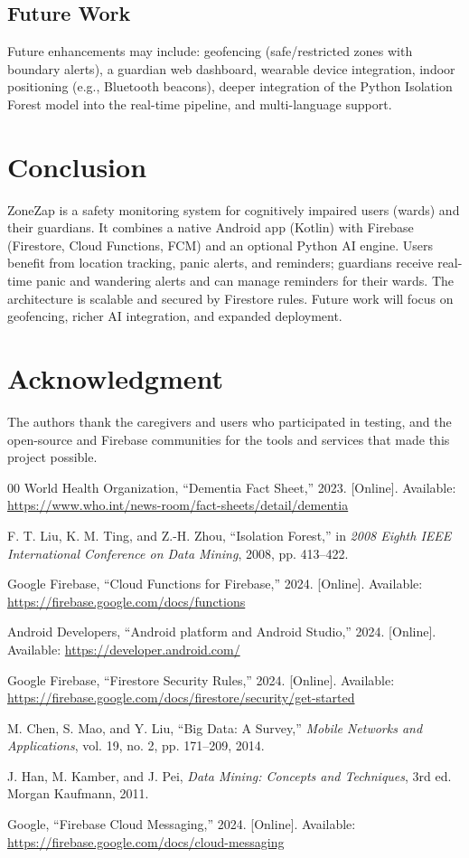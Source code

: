 \documentclass[conference]{IEEEtran}
\begin{document}
\subsection{Future Work}

Future enhancements may include: geofencing (safe/restricted zones with boundary alerts), a guardian web dashboard, wearable device integration, indoor positioning (e.g., Bluetooth beacons), deeper integration of the Python Isolation Forest model into the real-time pipeline, and multi-language support.

\section{Conclusion}

ZoneZap is a safety monitoring system for cognitively impaired users (wards) and their guardians. It combines a native Android app (Kotlin) with Firebase (Firestore, Cloud Functions, FCM) and an optional Python AI engine. Users benefit from location tracking, panic alerts, and reminders; guardians receive real-time panic and wandering alerts and can manage reminders for their wards. The architecture is scalable and secured by Firestore rules. Future work will focus on geofencing, richer AI integration, and expanded deployment.

\section*{Acknowledgment}

The authors thank the caregivers and users who participated in testing, and the open-source and Firebase communities for the tools and services that made this project possible.

\begin{thebibliography}{00}
 World Health Organization, ``Dementia Fact Sheet,'' 2023. [Online]. Available: \url{https://www.who.int/news-room/fact-sheets/detail/dementia}

 F. T. Liu, K. M. Ting, and Z.-H. Zhou, ``Isolation Forest,'' in \textit{2008 Eighth IEEE International Conference on Data Mining}, 2008, pp. 413--422.

 Google Firebase, ``Cloud Functions for Firebase,'' 2024. [Online]. Available: \url{https://firebase.google.com/docs/functions}

 Android Developers, ``Android platform and Android Studio,'' 2024. [Online]. Available: \url{https://developer.android.com/}

 Google Firebase, ``Firestore Security Rules,'' 2024. [Online]. Available: \url{https://firebase.google.com/docs/firestore/security/get-started}

 M. Chen, S. Mao, and Y. Liu, ``Big Data: A Survey,'' \textit{Mobile Networks and Applications}, vol. 19, no. 2, pp. 171--209, 2014.

 J. Han, M. Kamber, and J. Pei, \textit{Data Mining: Concepts and Techniques}, 3rd ed. Morgan Kaufmann, 2011.

 Google, ``Firebase Cloud Messaging,'' 2024. [Online]. Available: \url{https://firebase.google.com/docs/cloud-messaging}
\end{thebibliography}
\end{document}
